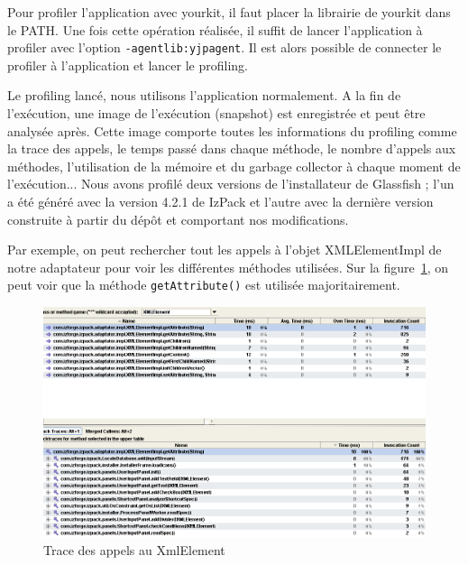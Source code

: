 Pour profiler l'application avec yourkit, il faut placer la librairie de yourkit dans le PATH.
Une fois cette opération réalisée, il suffit de lancer l'application à profiler avec l'option \verb|-agentlib:yjpagent|.
Il est alors possible de connecter le profiler à l'application et lancer le profiling.

Le profiling lancé, nous utilisons l'application normalement.
A la fin de l'exécution, une image de l'exécution (snapshot) est enregistrée et peut être analysée après.
Cette image comporte toutes les informations du profiling comme la trace des appels, le temps passé dans chaque méthode, le nombre d'appels aux méthodes, l'utilisation de la mémoire et du garbage collector à chaque moment de l'exécution...
Nous avons profilé deux versions de l'installateur de Glassfish ; l'un a été généré avec la version 4.2.1 de IzPack et l'autre avec la dernière version construite à partir du dépôt et comportant nos modifications.

Par exemple, on peut rechercher tout les appels à l'objet XMLElementImpl de notre adaptateur pour voir les différentes méthodes utilisées. Sur la figure~\ref{fig:yourkitXmlElement}, on peut voir que la méthode \verb|getAttribute()| est utilisée majoritairement.
\begin{figure}[H]
	\centering
	\includegraphics[width=1\textwidth]{../image/yourkitXmlElement.png}
	\caption{Trace des appels au XmlElement}
	\label{fig:yourkitXmlElement}
\end{figure}

